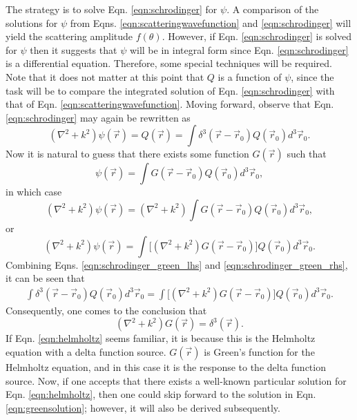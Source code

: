 The strategy is to solve Eqn. \ref{eqn:schrodinger} for $\psi$. A comparison of the solutions for $\psi$ from Eqns. \ref{eqn:scatteringwavefunction} and \ref{eqn:schrodinger} will yield the scattering amplitude $f(\theta)$. However, if Eqn. \ref{eqn:schrodinger} is solved for $\psi$ then it suggests that $\psi$ will be in integral form since  Eqn. \ref{eqn:schrodinger} is a differential equation. Therefore, some special techniques will be required. Note that it does not matter at this point that $Q$ is a function of $\psi$, since the task will be to compare the integrated solution of Eqn. \ref{eqn:schrodinger} with that of Eqn. \ref{eqn:scatteringwavefunction}. Moving forward, observe  that Eqn. \ref{eqn:schrodinger} may again be rewritten as
%
\begin{equation} \label{eqn:schrodinger_green_lhs}
(\nabla^2+k^2)\psi(\vec{r})=Q (\vec{r}) =\int \delta^3(\vec{r}-\vec{r}_0)Q(\vec{r}_0)d^3\vec{r}_0.
\end{equation}
Now it is natural to guess that there exists some function $G(\vec{r})$ such that
%
\begin{equation}
\label{eqn:psigreen}
\psi(\vec{r})=\int G(\vec{r}-\vec{r}_0)Q(\vec{r}_0)d^3\vec{r}_0,
\end{equation}
in which case
%
\begin{equation} \nonumber
(\nabla^2+k^2)\psi(\vec{r})=(\nabla^2+k^2)\int G(\vec{r}-\vec{r}_0)Q(\vec{r}_0) d^3\vec{r}_0,
\end{equation}
or
\begin{equation} \label{eqn:schrodinger_green_rhs}
(\nabla^2+k^2)\psi(\vec{r})=\int \big[(\nabla^2+k^2)G(\vec{r}-\vec{r}_0)\big]Q(\vec{r}_0) d^3\vec{r}_0.
\end{equation}
%
Combining Eqns. \ref{eqn:schrodinger_green_lhs} and \ref{eqn:schrodinger_green_rhs}, it can be seen that
\begin{align*}
\int \delta^3(\vec{r}-\vec{r}_0)Q(\vec{r}_0)d^3\vec{r}_0=\int \big[(\nabla^2+k^2)G(\vec{r}-\vec{r}_0)\big]Q(\vec{r}_0) d^3\vec{r}_0.
\end{align*}
Consequently, one comes to the conclusion that
%
\begin{equation}
\label{eqn:helmholtz}
(\nabla^2+k^2)G(\vec{r})=\delta^3(\vec{r}).
\end{equation}
If Eqn. \ref{eqn:helmholtz} seems familiar, it is because this is the Helmholtz equation with a delta function source. $G(\vec{r})$ is Green's function for the Helmholtz equation, and in this case it is the response to the delta function source. Now, if one accepts that there exists a well-known particular solution for Eqn. \ref{eqn:helmholtz}, then one could skip forward to the solution in Eqn. \ref{eqn:greensolution}; however, it will also be derived subsequently.

